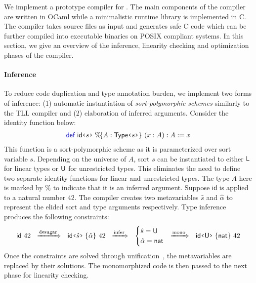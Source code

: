 We implement a prototype compiler for \TLLC{}. The main components of the compiler
are written in OCaml while a minimalistic runtime library is implemented in C.
The compiler takes \TLLC{} source files as input and generates safe C code which
can be further compiled into executable binaries on POSIX compliant systems.
In this section, we give an overview of the inference, linearity checking
and optimization phases of the compiler.

\paragraph{\textbf{Inference}}
To reduce code duplication and type annotation burden, we implement two forms of inference: 
(1) automatic instantiation of \emph{sort-polymorphic schemes} similarly to the TLL compiler and 
(2) elaboration of inferred arguments.
Consider the identity function below:
\begin{align*}
  \Def\ \textsf{id}\flq{s}\frq\ \%\!\{ A : \textsf{Type}\flq{s}\frq\}\ (x : A) : A := x
\end{align*}
This function is a sort-polymorphic scheme as it is parameterized over sort variable $s$.
Depending on the universe of $A$, sort $s$ can be instantiated to either $\textsf{L}$ for linear types
or $\textsf{U}$ for unrestricted types. This eliminates the need to define two separate identity functions
for linear and unrestricted types. The type $A$ here is marked by $\%$ to indicate that it is an
inferred argument. Suppose $\textsf{id}$ is applied to a natural number $42$. The compiler creates
two metavariables $\hat{s}$ and $\hat{\alpha}$ to represent the elided sort and type arguments respectively.
Type inference produces the following constraints:
\begin{align*}
  \textsf{id}\ 42 
  \ \ 
  \xRightarrow{\text{desugar}} 
  \ \ 
  \appI{\textsf{id}\flq{\hat{s}}\frq}{\hat{\alpha}}\ 42
  \ \ 
  \xRightarrow{\text{infer}} 
  \ \ 
  \begin{cases}
    \hat{s} = \Un \\
    \hat{\alpha} = \textsf{nat}
  \end{cases}
  \!\!
  \xRightarrow{\text{mono}} 
  \ \ 
  \appI{\textsf{id}\flq{\Un}\frq}{\textsf{nat}}\ 42
\end{align*}
Once the constraints are solved through unification~\cite{abel11}, the metavariables are
replaced by their solutions. The monomorphized code is then passed to the next phase for
linearity checking.


